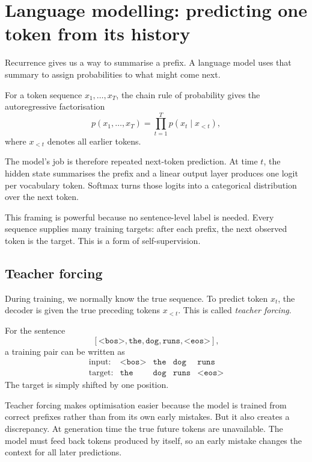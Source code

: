 \section{Language modelling: predicting one token from its history}

Recurrence gives us a way to summarise a prefix. A language model uses that summary to assign probabilities to what might come next.

For a token sequence \(x_1,\ldots,x_T\), the chain rule of probability gives the autoregressive factorisation
\begin{equation}
  p(x_1,\ldots,x_T)
  = \prod_{t=1}^{T} p(x_t \mid x_{<t}),
  \label{eq:week7-autoregressive}
\end{equation}
where \(x_{<t}\) denotes all earlier tokens.

The model's job is therefore repeated next-token prediction. At time \(t\), the hidden state summarises the prefix and a linear output layer produces one logit per vocabulary token. Softmax turns those logits into a categorical distribution over the next token.

This framing is powerful because no sentence-level label is needed. Every sequence supplies many training targets: after each prefix, the next observed token is the target. This is a form of self-supervision.

\subsection{Teacher forcing}

During training, we normally know the true sequence. To predict token \(x_t\), the decoder is given the true preceding tokens \(x_{<t}\). This is called \emph{teacher forcing}.

For the sentence
\[
  [\texttt{<bos>},\texttt{the},\texttt{dog},\texttt{runs},\texttt{<eos>}],
\]
a training pair can be written as
\[
\begin{array}{ccccc}
\text{input:} & \texttt{<bos>} & \texttt{the} & \texttt{dog} & \texttt{runs} \\
\text{target:} & \texttt{the} & \texttt{dog} & \texttt{runs} & \texttt{<eos>}
\end{array}
\]
The target is simply shifted by one position.

Teacher forcing makes optimisation easier because the model is trained from correct prefixes rather than from its own early mistakes. But it also creates a discrepancy. At generation time the true future tokens are unavailable. The model must feed back tokens produced by itself, so an early mistake changes the context for all later predictions.

